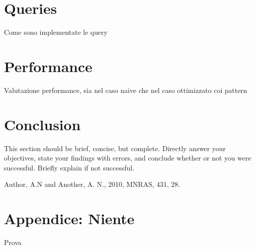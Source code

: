 \documentclass[letterpaper,11pt]{article}
\begin{document}
\section{Queries}
Come sono implementate le query

\section{Performance}
Valutazione performance, sia nel caso naive che nel caso ottimizzato coi pattern

\section{Conclusion}
This section should be brief, concise, but complete. Directly answer your objectives, state your findings with errors, and conclude whether or not you were successful. Briefly explain if not successful.

\begin{thebibliography}{99}

Author, A.N and Another, A. N., 2010, MNRAS, 431, 28.

\end{thebibliography}

\appendix

\section*{Appendice: Niente}

Prova
\end{document}
